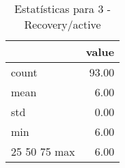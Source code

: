 \begin{table}[htbp]
\caption{Estatísticas para 3 - Recovery/active}
\label{tab:3_-_recovery_active_summary}
\begin{tabular}{lr}
\toprule
 & value \\
\midrule
count & 93.00 \\
mean & 6.00 \\
std & 0.00 \\
min & 6.00 \\
25%
50%
75%
max & 6.00 \\
\bottomrule
\end{tabular}
\end{table}
